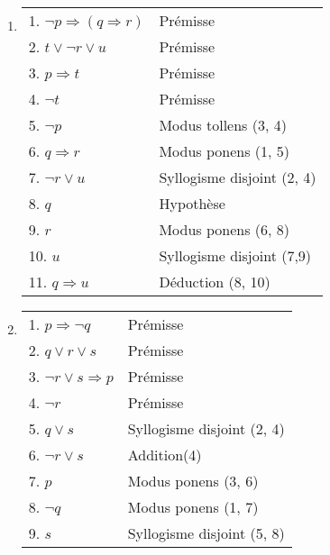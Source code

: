 \begin{enumerate}
	\item  \hspace{1em}
    \begin{center}
    \begin{tabular}{|l|l|}
    \hline
    1. $\lnot p \Rightarrow (q \Rightarrow r)$ & Prémisse \\

    2. $t \lor \lnot r \lor u$ & Prémisse \\
    3. $p \Rightarrow t$ & Prémisse \\
    4. $\lnot t$ & Prémisse \\
    5. $\lnot p$ & Modus tollens (3, 4) \\
    6. $q \Rightarrow r$ & Modus ponens (1, 5) \\
    7. $\lnot r \lor u$ & Syllogisme disjoint (2, 4) \\
    \hspace{0.5cm} 8. $q$ & Hypothèse \\
    \hspace{0.5cm} 9. $r$ & Modus ponens (6, 8) \\
    \hspace{0.5cm} 10. $u$ & Syllogisme disjoint (7,9) \\
    11. $q \Rightarrow u$ & Déduction (8, 10) \\
    \hline
    \end{tabular}
    \end{center}

	\item  \hspace{1em}
    \begin{center}
    \begin{tabular}{|l|l|}
    \hline
    1. $p \Rightarrow \lnot q$ & Prémisse \\
    2. $q \lor r \lor s$ & Prémisse \\
    3. $\lnot r \lor s \Rightarrow p$ & Prémisse \\
    4. $\lnot r$ & Prémisse \\
    5. $q \lor s$ & Syllogisme disjoint (2, 4) \\
    6. $\lnot r \lor s$ & Addition(4) \\
    7. $p$ & Modus ponens (3, 6) \\
    8. $\lnot q$ & Modus ponens (1, 7) \\
    9. $s$ & Syllogisme disjoint (5, 8) \\
    \hline
    \end{tabular}
    \end{center}


\end{enumerate}
